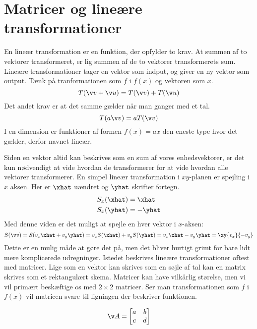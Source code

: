 \section{Matricer og lineære transformationer}

En lineær transformation er en funktion, der opfylder to krav. At summen af to vektorer transformeret, er lig summen af de to vektorer transformerets sum.
Lineære transformationer tager en vektor som indput, og giver en ny vektor som output. Tænk på tranformationen som $f$ i $f(x)$ og vektoren som $x$.
\begin{equation}
T(\v v+\v u) = T(\v v) + T(\v u)
\end{equation}
Det andet krav er at det samme gælder når man ganger med et tal.
\begin{equation}
T(a\v v) = aT(\v v)
\end{equation}
I en dimension er funktioner af formen $f(x) = ax$ den eneste type hvor det gælder, derfor navnet lineær.

Siden en vektor altid kan beskrives som en sum af vores enhedsvektorer, er det kun nødvendigt at vide hvordan de transformerer for at vide hvordan alle vektorer transformerer. En simpel lineær transformation i $xy$-planen er spejling i $x$ aksen. Her er $\xhat$ uændret og $\yhat$ skrifter fortegn.
\begin{align}
S_x(\xhat) &= \xhat\\
S_x(\yhat) &= -\yhat
\end{align}
Med denne viden er det muligt at spejle en hver vektor i $x$-aksen:
\begin{equation}
S(\v v) = S(v_x\xhat+v_y\yhat) = v_xS(\xhat)+v_yS(\yhat) = v_x\xhat-v_y\yhat = \xy{v_x}{-v_y}
\end{equation}
Dette er en mulig måde at gøre det på, men det bliver hurtigt grimt for bare lidt mere komplicerede udregninger. Istedet beskrives lineære transformationer oftest med matricer. Lige som en vektor kan skrives som en søjle af tal kan en matrix skrives som et rektangulært skema. Matricer kan have vilkårlig størelse, men vi vil primært beskæftige os med $2\times 2$ matricer.
Ser man transformationen som $f$ i $f(x)$ vil matricen svare til ligningen der beskriver funktionen.

\begin{equation}
\v A= \begin{bmatrix}
a & b\\c&d
\end{bmatrix}
\end{equation}

